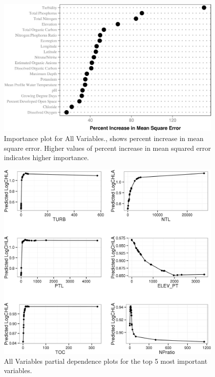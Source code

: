 \documentclass[12pt,]{article}
\begin{document}
\begin{figure}[htbp]
\centering
\includegraphics{manuscript_files/figure-latex/All_Importance-1.jpeg}
\caption{Importance plot for All Variables., shows percent increase in
mean square error. Higher values of percent increase in mean squared
error indicates higher importance. \label{fig:All_Importance}}
\end{figure}

\newpage

\begin{figure}[htbp]
\centering
\includegraphics{manuscript_files/figure-latex/all_partial_dependence-1.jpeg}
\caption{All Variables partial dependence plots for the top 5 most
important variables. \label{fig:all_partial_dependence}}
\end{figure}
\end{document}
